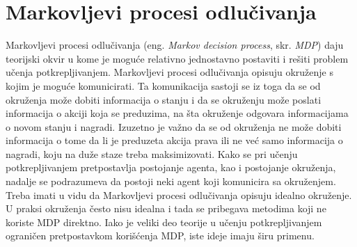 \section{Markovljevi procesi odlučivanja}
\label{sec:mdp}

Markovljevi procesi odlučivanja (eng. {\em Markov decision process}, skr. {\em MDP}) daju teorijski okvir u kome je moguće relativno jednostavno postaviti i rešiti problem učenja potkrepljivanjem. Markovljevi procesi odlučivanja opisuju okruženje s kojim je moguće komunicirati. Ta komunikacija sastoji se iz toga da se od okruženja može dobiti informacija o stanju i da se okruženju može poslati informacija o akciji koja se preduzima, na šta okruženje odgovara informacijama o novom stanju i nagradi. Izuzetno je važno da se od okruženja ne može dobiti informacija o tome da li je preduzeta akcija prava ili ne već samo informacija o nagradi, koju na duže staze treba maksimizovati. Kako se pri učenju potkrepljivanjem pretpostavlja postojanje agenta, kao i postojanje okruženja, nadalje se podrazumeva da postoji neki agent koji komunicira sa okruženjem. Treba imati u vidu da Markovljevi procesi odlučivanja opisuju idealno okruženje. U praksi okruženja često nisu idealna i tada se pribegava metodima koji ne koriste MDP direktno. Iako je veliki deo teorije u učenju potkrepljivanjem ograničen pretpostavkom korišćenja MDP, iste ideje imaju širu primenu.

